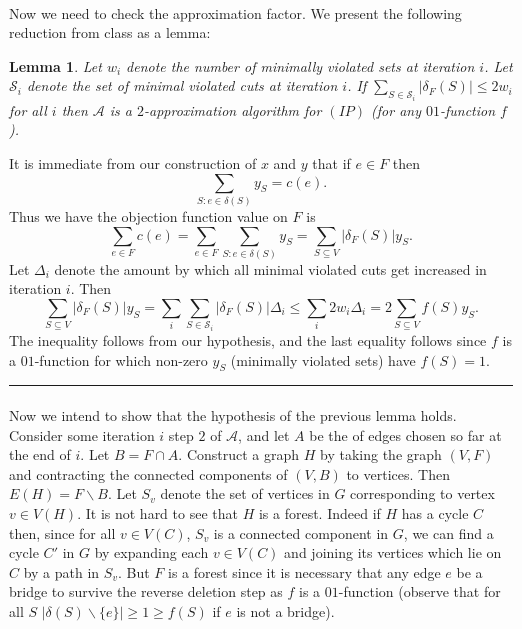 \documentclass[letterpaper,12pt,oneside,onecolumn]{article}
\newcommand{\cA}{\mathcal{A}} \newcommand{\cB}{\mathcal{B}}
\newcommand{\cS}{\mathcal{S}} \newcommand{\cT}{\mathcal{T}}
\newenvironment{proof}{{\bf Proof:  }}{\hfill\rule{2mm}{2mm}}
\newtheorem{lemma}[fact]{Lemma}
\begin{document}
\paragraph{}
Now we need to check the approximation factor. We present the following reduction from class as a lemma:
\begin{lemma}\label{lemma:degree}
Let $w_i$ denote the number of minimally violated sets at iteration $i$.  Let $\cS_i$ denote the set of minimal violated cuts at iteration $i$. If $\sum_{S\in \cS_i} |\delta_F(S)| \leq 2w_i$ for all $i$ then $\cA$ is a $2$-approximation algorithm for $(IP)$ (for any $01$-function $f$).
\end{lemma}
\begin{proof}
It is immediate from our construction of $x$ and $y$ that if $e \in F$ then
$$\sum_{S : e\in\delta(S)} y_S = c(e).$$
Thus we have the objection function value on $F$ is
$$\sum_{e\in F} c(e) = \sum_{e\in F} \sum_{S : e\in\delta(S)} y_S = \sum_{S\subseteq V} |\delta_F(S)|y_S.$$
Let $\Delta_i$ denote the amount by which all minimal violated cuts get increased in iteration $i$. Then
$$\sum_{S\subseteq V} |\delta_F(S)|y_S = \sum_{i} \sum_{S\in \cS_i} |\delta_F(S)|\Delta_i \leq \sum_{i} 2w_i \Delta_i = 2\sum_{S\subseteq V} f(S) y_S.$$
The inequality follows from our hypothesis, and the last equality follows since $f$ is a $01$-function for which non-zero $y_S$ (minimally violated sets) have $f(S) = 1$. 
\end{proof}
\paragraph{}
Now we intend to show that the hypothesis of the previous lemma holds. Consider some iteration $i$ step $2$ of $\cA$, and let $A$ be the of edges chosen so far at the end of $i$. Let $B = F \cap A$. Construct a graph $H$ by taking the graph $(V,F)$ and contracting the connected components of $(V,B)$ to vertices. Then $E(H) = F\backslash B$. Let $S_v$ denote the set of vertices in $G$ corresponding to vertex $v \in V(H)$. It is not hard to see that $H$ is a forest. Indeed if $H$ has a cycle $C$ then, since for all $v \in V(C)$, $S_v$ is a connected component in $G$, we can find a cycle $C'$ in $G$ by expanding each $v \in V(C)$ and joining its vertices which lie on $C$ by a path in $S_v$. But $F$ is a forest since it is necessary that any edge $e$ be a bridge to survive the reverse deletion step as $f$ is a $01$-function (observe that for all $S$ $|\delta(S) \backslash \{e\}| \geq 1 \geq f(S)$ if $e$ is not a bridge).
\end{document}
